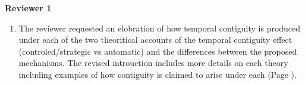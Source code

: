 \documentclass[12pt]{article}
\begin{document}
\vspace{20pt}

\textbf{\large{Reviewer 1}}

\begin{enumerate}

\item 
	The reviewer requested an elobration of how temporal contiguity is produced under each of the two theoritical accounts of the temporal contiguity effect (controled/strategic vs automatic) and the differences between the proposed mechanisms. The revised introuction includes more details on each theory including examples of how contiguity is claimed to arise under each (Page \pageref{TODO-2}). 


\end{enumerate}
\end{document}
